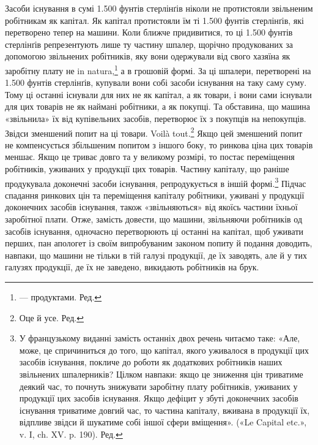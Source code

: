Засоби існування в сумі 1.500 фунтів стерлінґів ніколи не протистояли
звільненим робітникам як капітал. Як капітал протистояли
їм ті 1.500 фунтів стерлінґів, які перетворено тепер на
машини. Коли ближче придивитися, то ці 1.500 фунтів стерлінґів
репрезентують лише ту частину шпалер, щорічно продукованих
за допомогою звільнених робітників, яку вони одержували
від свого хазяїна як заробітну плату не in natura,\footnote*{
— продуктами. Ред.
} а в грошовій
формі. За ці шпалери, перетворені на 1.500 фунтів стерлінґів,
купували вони собі засоби існування на таку саму суму. Тому ці
останні існували для них не як капітал, а як товари, і вони сами
існували для цих товарів не як наймані робітники, а як покупці.
Та обставина, що машина «звільнила» їх від купівельних засобів,
перетворює їх з покупців на непокупців. Звідси зменшений
попит на ці товари. Voilà tout.\footnote*{
Оце й усе. Ред.
} Якщо цей зменшений попит не
компенсується збільшеним попитом з іншого боку, то ринкова
ціна цих товарів меншає. Якщо це триває довго та у великому
розмірі, то постає переміщення робітників, уживаних у продукції
цих товарів. Частину капіталу, що раніше продукувала доконечні
засоби існування, репродукується в іншій формі.\footnote*{
У французькому виданні замість останніх двох речень читаємо
таке: «Але, може, це спричиниться до того, що капітал, якого уживалося
в продукції цих засобів існування, покличе до роботи як додаткових
робітників наших звільнених шпалерників? Цілком навпаки: якщо це
зниження цін триватиме деякий час, то почнуть знижувати заробітну плату
робітників, уживаних у продукції цих засобів існування. Якщо дефіцит
у збуті доконечних засобів існування триватиме довгий час, то частина
капіталу, вживана в продукції їх, відпливе звідси й шукатиме собі іншої
сфери вміщення». («Le Capital etc.», v. I, ch. XV. p. 190). Ред.
} Підчас спадання
ринкових цін та переміщення капіталу робітники, уживані
у продукції доконечних засобів існування, також «звільняються»
від якоїсь частини їхньої заробітної плати. Отже, замість
довести, що машини, звільняючи робітників од засобів існування,
одночасно перетворюють ці останні на капітал, щоб уживати
перших, пан апологет із своїм випробуваним законом попиту й
подання доводить, навпаки, що машини не тільки в тій галузі
продукції, де їх заводять, але й у тих галузях продукції, де їх
не заведено, викидають робітників на брук.

